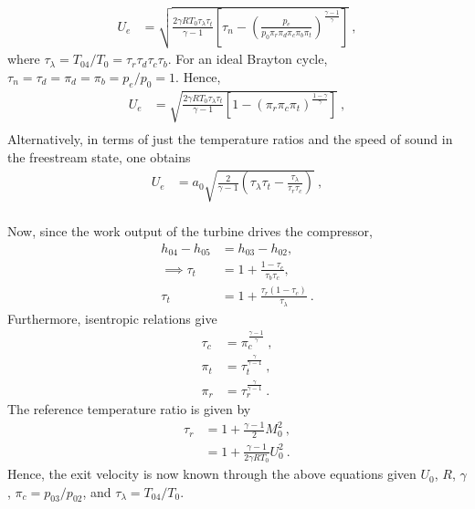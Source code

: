 \documentclass[12pt]{article}
\begin{document}
\begin{enumerate}[label=(\alph*)]
\begin{enumerate}[label=(\roman{*})]
\begin{equation}
\begin{aligned}
						U_e&=\sqrt{\frac{2\gamma RT_{0}\tau_\lambda\tau_t}{\gamma-1}\left[\tau_n-\left(\frac{p_{e}}{p_{0}\pi_r\pi_d\pi_c\pi_b\pi_t}\right)^{\frac{\gamma-1}{\gamma}}\right]}\ ,
					\end{aligned}
				\end{equation}
				where $\tau_\lambda=\boxed{T_{04}/T_0}=\tau_r\tau_d\tau_c\tau_b$. For an ideal Brayton cycle, $\tau_n=\tau_d=\pi_d=\pi_b=p_e/p_0=1$. Hence,
				\begin{equation}
					\begin{aligned}
					U_e&=\boxed{\sqrt{\frac{2\gamma RT_{0}\tau_\lambda\tau_t}{\gamma-1}\left[1-\left(\pi_r\pi_c\pi_t\right)^{\frac{1-\gamma}{\gamma}}\right]}}\ , \\
					\end{aligned}
				\end{equation}
				Alternatively, in terms of just the temperature ratios and the speed of sound in the freestream state, one obtains
				\begin{equation}
				\begin{aligned}
				U_e&=a_0\sqrt{\frac{2}{\gamma-1}\left(\tau_\lambda\tau_t-\frac{\tau_\lambda}{\tau_r\tau_c}\right)}\ , \\
				\end{aligned}
				\end{equation}
				
				Now, since the work output of the turbine drives the compressor,
				\begin{equation}
					\label{EQ_2_TT}
					\begin{aligned}
						h_{04}-h_{05}&=h_{03}-h_{02}, \\
						\implies \tau_t&=1+\frac{1-\tau_c}{\tau_b\tau_c}, \\
						\tau_t&=\boxed{1+\frac{\tau_r(1-\tau_c)}{\tau_\lambda}}\ .
					\end{aligned}
				\end{equation}
				Furthermore, isentropic relations give
				\begin{equation}
					\begin{aligned}
						\tau_c&=\boxed{\pi_c^{\frac{\gamma-1}{\gamma}}}\ , \\
						\pi_t&=\boxed{\tau_t^{\frac{\gamma}{\gamma-1}}}\ , \\
						\pi_r&=\boxed{\tau_r^{\frac{\gamma}{\gamma-1}}}\ .
					\end{aligned}
				\end{equation}
				The reference temperature ratio is given by
				\begin{equation}
					\begin{aligned}
						\tau_r&=1+\frac{\gamma-1}{2}M_0^2\ , \\
							  &=\boxed{1+\frac{\gamma-1}{2\gamma RT_0}U_0^2}\ .
					\end{aligned}
				\end{equation}
				Hence, the exit velocity is now known through the above equations given $U_0$, $R$, $\gamma$, $\pi_c=p_{03}/p_{02}$, and $\tau_\lambda=T_{04}/T_{0}$.
				

\end{enumerate}
\end{enumerate}
\end{document}
